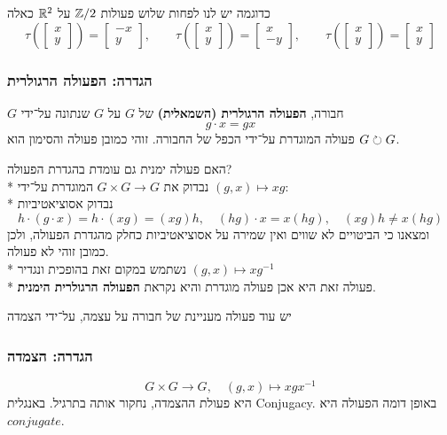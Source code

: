 כדוגמה יש לנו לפחות שלוש פעולות $\mathbb{Z}/2$ על $\mathbb{R}^2$ כאלה
\[
	\tau( \begin{bmatrix} x \\ y \end{bmatrix}) = \begin{bmatrix} -x \\ y \end{bmatrix}, \qquad
	\tau( \begin{bmatrix} x \\ y \end{bmatrix}) = \begin{bmatrix} x \\ -y \end{bmatrix}, \qquad
	\tau( \begin{bmatrix} x \\ y \end{bmatrix}) = \begin{bmatrix} x \\ y \end{bmatrix}
\]

\subsubsection{הגדרה: הפעולה הרגולרית}
$G$ חבורה, \textbf{הפעולה הרגולרית (השמאלית)} של $G$ על $G$ שנתונה על־ידי
\[
	g \cdot x = gx
\]
פעולה המוגדרת על־ידי הכפל של החבורה. זוהי כמובן פעולה והסימון הוא $G \circlearrowright G$.

האם פעולה ימנית גם עומדת בהגדרת הפעולה? \\*
נבדוק את $G \times G \to G$ המוגדרת על־ידי $(g, x) \mapsto xg$: \\*
נבדוק אסוציאטיביות
\[
	h \cdot (g \cdot x) = h \cdot (xg) = (xg)h, \quad (hg) \cdot x = x (hg), \quad (xg) h \ne x (hg)
\]
ומצאנו כי הביטויים לא שווים ואין שמירה על אסוציאטיביות כחלק מהגדרת הפעולה, ולכן כמובן זוהי לא פעולה. \\*
נשתמש במקום זאת בהופכית ונגדיר $(g, x) \mapsto x g^{-1}$ \\*
פעולה זאת היא אכן פעולה מוגדרת והיא נקראת \textbf{הפעולה הרגולרית הימנית}.

יש עוד פעולה מעניינת של חבורה על עצמה, על־ידי הצמדה
\subsubsection{הגדרה: הצמדה}
\[
	G \times G \to G, \quad (g, x) \mapsto x g x^{-1}
\]
היא פעולת ההצמדה, נחקור אותה בתרגיל. באנגלית Conjugacy.
באופן דומה הפעולה היא $conjugate$.


